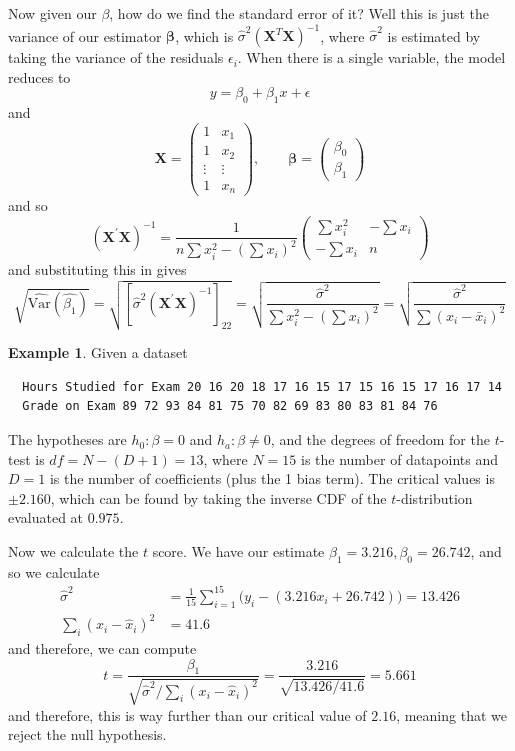 \documentclass{article}
\theoremstyle{definition}
\newtheorem{example}{Example}[section]
\begin{document}
  Now given our $\beta$, how do we find the standard error of it? Well this is just the variance of our estimator $\boldsymbol{\beta}$, which is $\hat{\sigma}^2 (\mathbf{X}^T \mathbf{X})^{-1}$, where $\hat{\sigma}^2$ is estimated by taking the variance of the residuals $\epsilon_i$. When there is a single variable, the model reduces to 
  \[y = \beta_0 + \beta_1 x + \epsilon\]
  and 
  \[\mathbf{X} = \left(
  \begin{array}{cc}
  1 & x_1 \\
  1 & x_2 \\
  \vdots & \vdots \\
  1 & x_n
  \end{array}
  \right), \qquad \boldsymbol{\beta} = \left(
  \begin{array}{c}
  \beta_0 \\ \beta_1 
  \end{array}
  \right)\]
  and so 
  \[(\mathbf{X}^{\prime} \mathbf{X})^{-1} = \frac{1}{n\sum x_i^2 - (\sum x_i)^2} 
  \left(
  \begin{array}{cc}
  \sum x_i^2 & -\sum x_i \\
  -\sum x_i  & n
  \end{array}
  \right)\]
  and substituting this in gives 
  \[\sqrt{\widehat{\textrm{Var}}(\hat{\beta_1})} = \sqrt{[\hat{\sigma}^2  (\mathbf{X}^{\prime} \mathbf{X})^{-1}]_{22}} = \sqrt{\frac{\hat{\sigma}^2}{\sum x_i^2 - (\sum x_i)^2}} = \sqrt{\frac{\hat{\sigma}^2}{\sum (x_i - \bar{x}_i)^2}}\]

  \begin{example}
  Given a dataset 
  \begin{verbatim}
  Hours Studied for Exam 20 16 20 18 17 16 15 17 15 16 15 17 16 17 14
  Grade on Exam 89 72 93 84 81 75 70 82 69 83 80 83 81 84 76
  \end{verbatim}
  The hypotheses are $h_0 : \beta = 0$ and $h_a : \beta \neq 0$, and the degrees of freedom for the $t$-test is $df = N - (D + 1) = 13$, where $N = 15$ is the number of datapoints and $D = 1$ is the number of coefficients (plus the 1 bias term). The critical values is $\pm 2.160$, which can be found by taking the inverse CDF of the $t$-distribution evaluated at $0.975$. 

  Now we calculate the $t$ score. We have our estimate $\beta_1 = 3.216, \beta_0 = 26.742$, and so we calculate 
  \begin{align*}
      \hat{\sigma}^2 & = \frac{1}{15} \sum_{i=1}^{15} \big( y_i - (3.216 x_i + 26.742) \big) = 13.426 \\
      \sum_{i} (x_i - \hat{x}_i)^2 & = 41.6 
  \end{align*}
  and therefore, we can compute 
  \[t = \frac{\beta_1}{\sqrt{\hat{\sigma}^2 /  \sum_{i} (x_i - \hat{x}_i)^2}} = \frac{3.216}{\sqrt{13.426/41.6}} = 5.661\]
  and therefore, this is way further than our critical value of $2.16$, meaning that we reject the null hypothesis. 
  \end{example}
\end{document}
